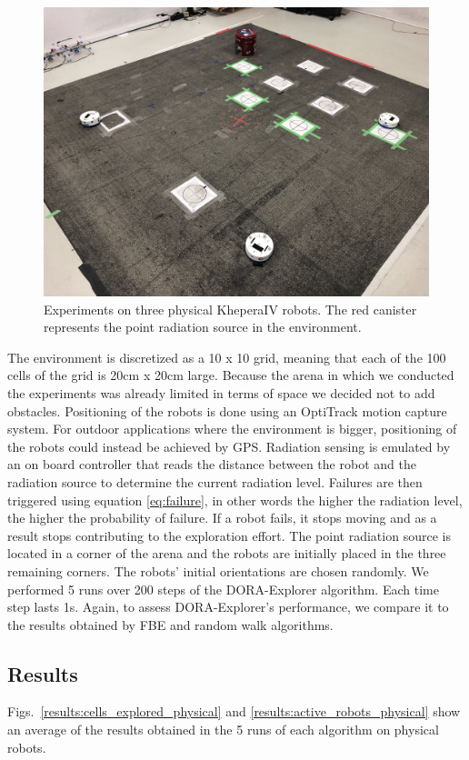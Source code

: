 \documentclass[letterpaper, 10 pt, conference]{ieeeconf}
\begin{document}
\begin{figure}[h]
    \centering
    \captionsetup{belowskip=-20pt}
    \includegraphics[width=0.65\columnwidth]{images/arena.jpeg}
    \caption{Experiments on three physical KheperaIV robots. The red canister represents the point radiation source in the environment.}
    \label{arena}
\end{figure}

The environment is discretized as a 10 x 10 grid, meaning that each of
the 100 cells of the grid is 20cm x 20cm large. Because the arena in
which we conducted the experiments was already limited in terms of
space we decided not to add obstacles. 
Positioning of the
robots is done using an OptiTrack motion capture system. For outdoor
applications where the environment is bigger, positioning of the
robots could instead be achieved by GPS. Radiation sensing is emulated
by an on board controller that reads the distance between the robot
and the radiation source to determine the current radiation
level. Failures are then triggered using equation \eqref{eq:failure},
in other words the higher the radiation level, the higher the
probability of failure. If a robot fails, it stops moving and as a
result stops contributing to the exploration effort. The point
radiation source is located in a corner of the arena and the robots
are initially placed in the three remaining corners. The robots'
initial orientations are chosen randomly.  We performed 5 runs over
200 steps of the DORA-Explorer algorithm. Each time step lasts 1s. Again, to assess DORA-Explorer's
performance, we compare it to the results obtained by FBE and random
walk algorithms.


\subsection{Results}
Figs.~\ref{results:cells_explored_physical} and
\ref{results:active_robots_physical} show an average of the results
obtained in the 5 runs of each algorithm on physical robots.
\end{document}
